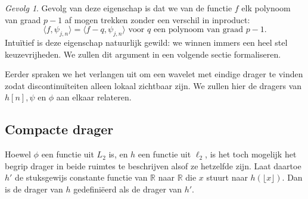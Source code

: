 \documentclass[11pt]{uvamath}
\newcommand{\R}{\mathbb{R}}
\theoremstyle{plain}
\theoremstyle{definition}
\theoremstyle{remark}
\newtheorem{gevolg}{Gevolg}[stelling]
\begin{document}
\begin{gevolg}
  Gevolg van deze eigenschap is dat we van de functie $f$ elk polynoom van graad $p-1$ af mogen trekken zonder een verschil in inproduct:
  \[
  \langle f, \psi_{j,n} \rangle = \langle f - q, \psi_{j,n} \rangle \text{ voor $q$ een polynoom van graad $p-1$}.
  \]
  Intu\"itief is deze eigenschap natuurlijk gewild: we winnen immers een heel stel keuzevrijheden. We zullen dit argument in een volgende sectie formaliseren.
\end{gevolg}

Eerder spraken we het verlangen uit om een wavelet met eindige drager te vinden zodat discontinu\"iteiten alleen lokaal zichtbaar zijn. We zullen hier de dragers van $h[n], \psi$ en $\phi$ aan elkaar relateren.

\subsection{Compacte drager}
Hoewel $\phi$ een functie uit $L_2$ is, en $h$ een functie uit $\ell_2$, is het toch mogelijk het begrip drager in beide ruimtes te beschrijven alsof ze hetzelfde zijn. Laat daartoe $h'$ de stuksgewijs constante functie van $\R$ naar $\R$ die $x$ stuurt naar $h(\lfloor x \rfloor)$. Dan is de drager van $h$ gedefini\"eerd als de drager van $h'$.
\end{document}
